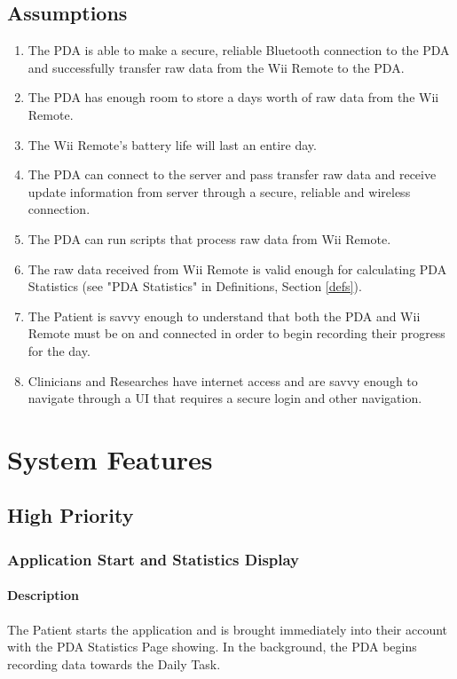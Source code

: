 \documentclass{article}
\begin{document}
\subsection {Assumptions}
\begin{enumerate}
\item The PDA is able to make a secure, reliable Bluetooth connection to the PDA and successfully transfer raw data from the Wii Remote to the PDA.
\item The PDA has enough room to store a days worth of raw data from the Wii Remote.
\item The Wii Remote's battery life will last an entire day.
\item The PDA can connect to the server and pass transfer raw data and receive update information from server through a secure, reliable and wireless connection.
\item The PDA can run scripts that process raw data from Wii Remote.
\item The raw data received from Wii Remote is valid enough for calculating PDA Statistics (see "PDA Statistics" in Definitions, Section \ref{defs}).
\item The Patient is savvy enough to understand that both the PDA and Wii Remote must be on and connected in order to begin recording their progress for the day.
\item Clinicians and Researches have internet access and are savvy enough to navigate through a UI that requires a secure login and other navigation.
\end {enumerate}


\section{System Features}

\subsection{High Priority}

\subsubsection{Application Start and Statistics Display}\label{sec: App Start}

\paragraph{Description}
The Patient starts the application and is brought immediately into their account with the PDA Statistics Page showing. In the background, the PDA begins recording data towards the Daily Task.
\end{document}
